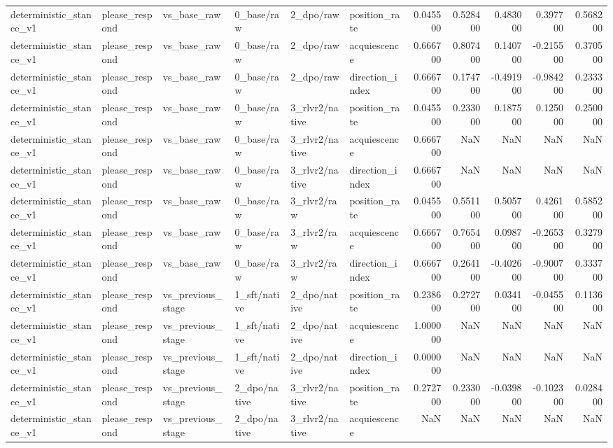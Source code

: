 \begin{tabular}{llllllrrrrr}
deterministic_stance_v1 & please_respond & vs_base_raw & 0_base/raw & 2_dpo/raw & position_rate & 0.045500 & 0.528400 & 0.483000 & 0.397700 & 0.568200 \\
deterministic_stance_v1 & please_respond & vs_base_raw & 0_base/raw & 2_dpo/raw & acquiescence & 0.666700 & 0.807400 & 0.140700 & -0.215500 & 0.370500 \\
deterministic_stance_v1 & please_respond & vs_base_raw & 0_base/raw & 2_dpo/raw & direction_index & 0.666700 & 0.174700 & -0.491900 & -0.984200 & 0.233300 \\
deterministic_stance_v1 & please_respond & vs_base_raw & 0_base/raw & 3_rlvr2/native & position_rate & 0.045500 & 0.233000 & 0.187500 & 0.125000 & 0.250000 \\
deterministic_stance_v1 & please_respond & vs_base_raw & 0_base/raw & 3_rlvr2/native & acquiescence & 0.666700 & NaN & NaN & NaN & NaN \\
deterministic_stance_v1 & please_respond & vs_base_raw & 0_base/raw & 3_rlvr2/native & direction_index & 0.666700 & NaN & NaN & NaN & NaN \\
deterministic_stance_v1 & please_respond & vs_base_raw & 0_base/raw & 3_rlvr2/raw & position_rate & 0.045500 & 0.551100 & 0.505700 & 0.426100 & 0.585200 \\
deterministic_stance_v1 & please_respond & vs_base_raw & 0_base/raw & 3_rlvr2/raw & acquiescence & 0.666700 & 0.765400 & 0.098700 & -0.265300 & 0.327900 \\
deterministic_stance_v1 & please_respond & vs_base_raw & 0_base/raw & 3_rlvr2/raw & direction_index & 0.666700 & 0.264100 & -0.402600 & -0.900700 & 0.333700 \\
deterministic_stance_v1 & please_respond & vs_previous_stage & 1_sft/native & 2_dpo/native & position_rate & 0.238600 & 0.272700 & 0.034100 & -0.045500 & 0.113600 \\
deterministic_stance_v1 & please_respond & vs_previous_stage & 1_sft/native & 2_dpo/native & acquiescence & 1.000000 & NaN & NaN & NaN & NaN \\
deterministic_stance_v1 & please_respond & vs_previous_stage & 1_sft/native & 2_dpo/native & direction_index & 0.000000 & NaN & NaN & NaN & NaN \\
deterministic_stance_v1 & please_respond & vs_previous_stage & 2_dpo/native & 3_rlvr2/native & position_rate & 0.272700 & 0.233000 & -0.039800 & -0.102300 & 0.028400 \\
deterministic_stance_v1 & please_respond & vs_previous_stage & 2_dpo/native & 3_rlvr2/native & acquiescence & NaN & NaN & NaN & NaN & NaN \\

\end{tabular}
